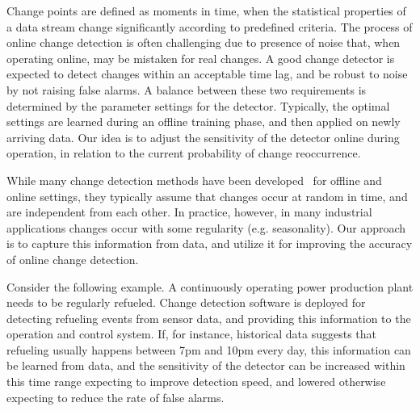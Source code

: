 Change points are defined as moments in time, when the statistical properties of a data stream change significantly according to predefined criteria.
The process of online change detection is often challenging due to presence of noise that, when operating online, may be mistaken for real changes.
A good change detector is expected to detect changes within an acceptable time lag, and be robust to noise by not raising false alarms.
A balance between these two requirements is determined by the parameter settings for the detector.
Typically, the optimal settings are learned during an offline training phase, and then applied on newly arriving data.
Our idea is to adjust the sensitivity of the detector online during operation, in relation to the current probability of change reoccurrence.

While many change detection methods have been developed~\cite{Nikiforov,Polunchenko2011} for offline and online settings, they typically assume that changes occur at random in time, and are independent from each other.
In practice, however, in many industrial applications changes occur with some regularity (e.g. seasonality).
Our approach is to capture this information from data, and utilize it for improving the accuracy of online change detection.

Consider the following example.
A continuously operating power production plant needs to be regularly refueled.
Change detection software is deployed for detecting refueling events from sensor data, and providing this information to the operation and control system.
If, for instance, historical data suggests that refueling usually happens between 7pm and 10pm every day, this information can be learned from data, and the sensitivity of the detector can be increased within this time range expecting to improve detection speed, and lowered otherwise expecting to reduce the rate of false alarms.

